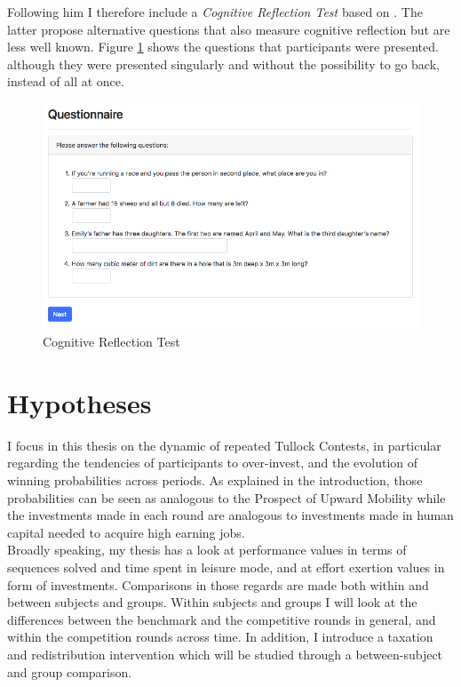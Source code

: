     Following him I therefore include a \textit{Cognitive Reflection Test} based on \cite{thomson2016}. The latter propose alternative questions that also measure cognitive reflection but are less well known. Figure \ref{fig:crt_quest} shows the questions that participants were presented. although they were presented singularly and without the possibility to go back, instead of all at once.
    
    \begin{figure}
        \centering
        \includegraphics[width=\textwidth]{graphs/CRT_Quest.png}
        \caption{Cognitive Reflection Test \citep{thomson2016}}
        \label{fig:crt_quest}
    \end{figure}
    
    \section{Hypotheses}\label{sec:hyp}
    
    I focus in this thesis on the dynamic of repeated Tullock Contests, in particular regarding the tendencies of participants to over-invest, and the evolution of winning probabilities across periods. As explained in the introduction, those probabilities can be seen as analogous to the Prospect of Upward Mobility while the investments made in each round are analogous to investments made in human capital needed to acquire high earning jobs.\\
    
    Broadly speaking, my thesis has a look at performance values in terms of sequences solved and time spent in leisure mode, and at effort exertion values in form of investments. Comparisons in those regards are made both within and between subjects and groups. Within subjects and groups I will look at the differences between the benchmark and the competitive rounds in general, and within the competition rounds across time. In addition, I introduce a taxation and redistribution intervention which will be studied through a between-subject and group comparison.\\
    
